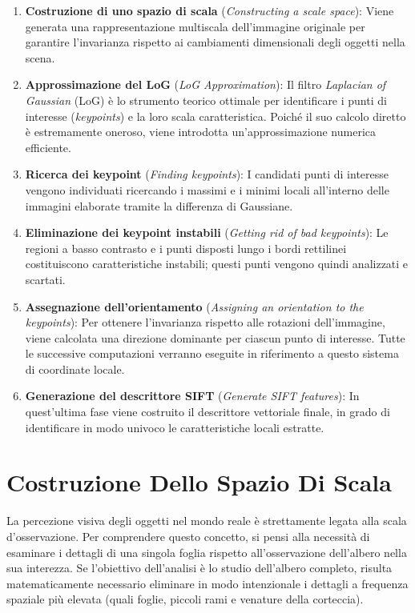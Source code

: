 ﻿\documentclass[11pt, a4paper]{article}
\begin{document}
\begin{enumerate}
    \item \textbf{Costruzione di uno spazio di scala} (\emph{Constructing a scale space}): Viene generata una rappresentazione multiscala dell'immagine originale per garantire l'invarianza rispetto ai cambiamenti dimensionali degli oggetti nella scena.
    \item \textbf{Approssimazione del LoG} (\emph{LoG Approximation}): Il filtro \emph{Laplacian of Gaussian} (LoG) è lo strumento teorico ottimale per identificare i punti di interesse (\emph{keypoints}) e la loro scala caratteristica. Poiché il suo calcolo diretto è estremamente oneroso, viene introdotta un'approssimazione numerica efficiente.
    \item \textbf{Ricerca dei keypoint} (\emph{Finding keypoints}): I candidati punti di interesse vengono individuati ricercando i massimi e i minimi locali all'interno delle immagini elaborate tramite la differenza di Gaussiane.
    \item \textbf{Eliminazione dei keypoint instabili} (\emph{Getting rid of bad keypoints}): Le regioni a basso contrasto e i punti disposti lungo i bordi rettilinei costituiscono caratteristiche instabili; questi punti vengono quindi analizzati e scartati.
    \item \textbf{Assegnazione dell'orientamento} (\emph{Assigning an orientation to the keypoints}): Per ottenere l'invarianza rispetto alle rotazioni dell'immagine, viene calcolata una direzione dominante per ciascun punto di interesse. Tutte le successive computazioni verranno eseguite in riferimento a questo sistema di coordinate locale.
    \item \textbf{Generazione del descrittore SIFT} (\emph{Generate SIFT features}): In quest'ultima fase viene costruito il descrittore vettoriale finale, in grado di identificare in modo univoco le caratteristiche locali estratte.
\end{enumerate}

\newpage

\section{Costruzione Dello Spazio Di Scala}

La percezione visiva degli oggetti nel mondo reale è strettamente legata alla scala d'osservazione. Per comprendere questo concetto, si pensi alla necessità di esaminare i dettagli di una singola foglia rispetto all'osservazione dell'albero nella sua interezza. Se l'obiettivo dell'analisi è lo studio dell'albero completo, risulta matematicamente necessario eliminare in modo intenzionale i dettagli a frequenza spaziale più elevata (quali foglie, piccoli rami e venature della corteccia).
\end{document}
